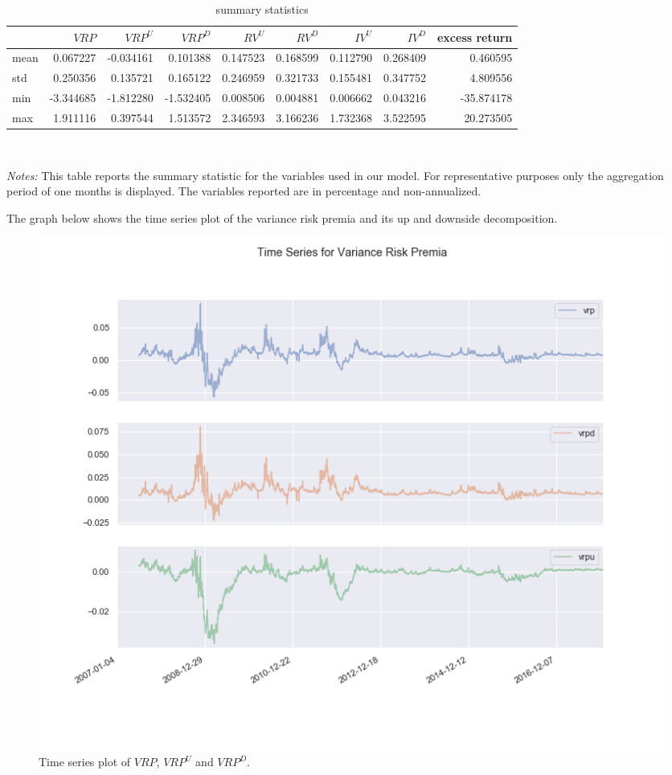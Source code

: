 \begin{table}[h]
\begin{center}
\caption{summary statistics}
\label{table1}
\hspace*{-1cm}
\begin{tabular}{l|rrr|rr|rr|r}
\toprule
{} &  $VRP$ &  $VRP^{U}$  &   $VRP^{D}$  &   $RV^{U}$ &    $RV^{D}$ &    $IV^{U}$  &          $IV^{D}$ & excess return\\
\midrule
mean  &     0.067227 &    -0.034161 &     0.101388 &     0.147523 &     0.168599 &     0.112790 &     0.268409 &     0.460595 \\
std   &     0.250356 &     0.135721 &     0.165122 &     0.246959 &     0.321733 &     0.155481 &     0.347752 &     4.809556 \\
min   &    -3.344685 &    -1.812280 &    -1.532405 &     0.008506 &     0.004881 &     0.006662 &     0.043216 &   -35.874178 \\
max   &     1.911116 &     0.397544 &     1.513572 &     2.346593 &     3.166236 &     1.732368 &     3.522595 &    20.273505 \\
\bottomrule
\end{tabular}\hspace*{-1cm}\\
\end{center}
\textit{Notes:} This table reports the summary statistic for the variables used in our model. For representative purposes only the aggregation period of one months is displayed. The variables reported are in percentage and non-annualized.
\end{table}


The graph below shows the time series plot of the variance risk premia and its up and downside decomposition. 

\begin{figure}[h]
\centering
\includegraphics[scale = 0.4]{figures/TsPlots.png}
\caption{Time series plot of $VRP$, $VRP^U$ and $VRP^D$.}
\label{fig:TsPlot}
\end{figure}